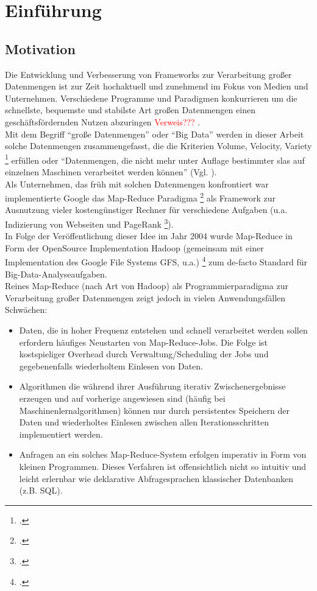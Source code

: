 \chapter{Einführung}

\section{Motivation}

Die Entwicklung und Verbesserung von Frameworks zur Verarbeitung großer Datenmengen ist zur Zeit hochaktuell und zunehmend im Fokus von Medien und Unternehmen. Verschiedene Programme und Paradigmen konkurrieren um die schnellste, bequemste und stabilste Art großen Datenmengen einen geschäftsfördernden Nutzen abzuringen \textcolor{red}{Verweis???} .\\

Mit dem Begriff "`große Datenmengen"' oder "`Big Data"' werden in dieser Arbeit solche Datenmengen zusammengefasst, die die Kriterien Volume, Velocity, Variety \footcite{Lan01} erfüllen oder "`Datenmengen, die nicht mehr unter Auflage bestimmter \gls{sla}s auf einzelnen Maschinen verarbeitet werden können"' (Vgl. \cite{Sam14}).\\

Als Unternehmen, das früh mit solchen Datenmengen konfrontiert war implementierte Google das Map-Reduce Paradigma \footcite{Dean04} als Framework zur Ausnutzung vieler kostengünstiger Rechner für verschiedene Aufgaben (u.a.  Indizierung von Webseiten und PageRank \footcite{page2001method}). \\

In Folge der Veröffentlichung dieser Idee im Jahr 2004 wurde Map-Reduce in Form der OpenSource Implementation Hadoop (gemeinsam mit einer Implementation des Google File Systems GFS, u.a.) \footcite{Ghema03} zum de-facto Standard für Big-Data-Analyseaufgaben.\\

Reines Map-Reduce (nach Art von Hadoop) als Programmierparadigma zur Verarbeitung großer Datenmengen zeigt jedoch in vielen Anwendungsfällen Schwächen:
\begin{itemize}
	\item Daten, die in hoher Frequenz entstehen und schnell verarbeitet werden sollen erfordern häufiges Neustarten von Map-Reduce-Jobs. Die Folge ist kostspieliger Overhead durch Verwaltung/Scheduling der Jobs und gegebenenfalls wiederholtem Einlesen von Daten.
	\item Algorithmen die während ihrer Ausführung iterativ Zwischenergebnisse erzeugen und auf vorherige angewiesen sind (häufig bei Maschinenlernalgorithmen) können nur durch persistentes Speichern der Daten und wiederholtes Einlesen zwischen allen Iterationsschritten implementiert werden.
	\item Anfragen an ein solches Map-Reduce-System erfolgen imperativ in Form von kleinen Programmen. Dieses Verfahren ist offensichtlich nicht so intuitiv und leicht erlernbar wie deklarative Abfragesprachen klassischer Datenbanken (z.B. SQL).
\end{itemize}

